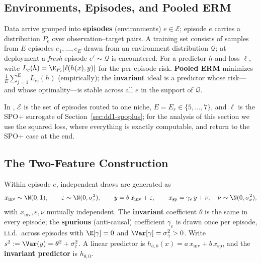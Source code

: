 \subsection{Environments, Episodes, and Pooled ERM}

\begin{definition}
\label{def:dd1-environments}
Data arrive grouped into \textbf{episodes} (environments)
$e \in \mathcal{E}$; episode $e$ carries a distribution $P_e$ over
observation--target pairs. A training set consists of samples from $E$
episodes $e_1, \dots, e_E$ drawn from an environment distribution
$\mathcal{Q}$; at deployment a \emph{fresh} episode $e' \sim \mathcal{Q}$ is
encountered. For a predictor $h$ and loss $\ell$, write
$L_e(h) = \E_{P_e}[\ell(h(x), y)]$ for the per-episode risk. \textbf{Pooled
ERM} minimizes $\frac{1}{E}\sum_{j=1}^E L_{e_j}(h)$ (empirically); the
\textbf{invariant} ideal is a predictor whose risk---and whose optimality---is
stable across all $e$ in the support of $\mathcal{Q}$.
\end{definition}

In \nm{}, $\mathcal{E}$ is the set of episodes routed to one niche, $E = E_r
\in \{5, \dots, 7\}$, and $\ell$ is the SPO+ surrogate of
Section~\ref{sec:dd1-spoplus}; for the analysis of this section we use the
squared loss, where everything is exactly computable, and return to the SPO+
case at the end.

\subsection{The Two-Feature Construction}

\begin{definition}
\label{def:dd1-twofeature}
Within episode $e$, independent draws are generated as
\begin{equation}
\label{eq:dd1-sem}
x_{\mathrm{inv}} \sim \N(0, 1), \qquad
\varepsilon \sim \N(0, \sigma_\varepsilon^2), \qquad
y = \theta\, x_{\mathrm{inv}} + \varepsilon, \qquad
x_{\mathrm{sp}} = \gamma_e\, y + \nu, \quad \nu \sim \N(0, \sigma_\nu^2),
\end{equation}
with $x_{\mathrm{inv}}, \varepsilon, \nu$ mutually independent. The
\textbf{invariant} coefficient $\theta$ is the same in every episode; the
\textbf{spurious} (anti-causal) coefficient $\gamma_e$ is drawn once per
episode, i.i.d.\ across episodes with $\E[\gamma] = 0$ and
$\Var[\gamma] = \sigma_\gamma^2 > 0$. Write $s^2 := \Var(y) = \theta^2 +
\sigma_\varepsilon^2$. A linear predictor is
$h_{a,b}(x) = a\, x_{\mathrm{inv}} + b\, x_{\mathrm{sp}}$, and the
\textbf{invariant predictor} is $h_{\theta, 0}$.
\end{definition}

